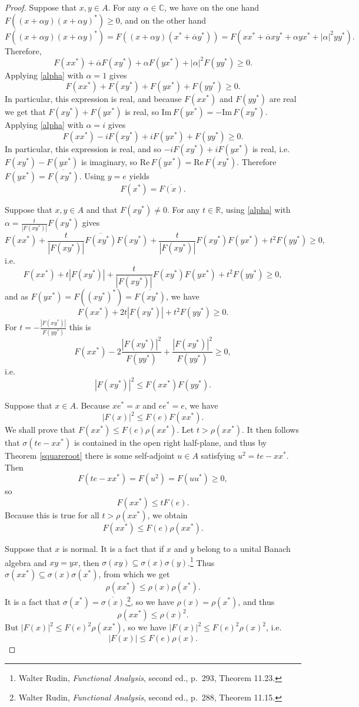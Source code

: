 \documentclass{article}
\def\Re{\ensuremath{\mathrm{Re}}\,}
\def\Im{\ensuremath{\mathrm{Im}}\,}
\theoremstyle{definition}
\theoremstyle{definition}
\begin{document}
\begin{proof}
Suppose that $x,y \in A$.
For any $\alpha \in \mathbb{C}$, we have on the one hand $F((x+\alpha y)(x+\alpha y)^*) \geq 0$, and on the other hand
\[
F((x+\alpha y)(x+\alpha y)^*) = F((x+\alpha y)(x^*+\overline{\alpha}y^*))  = 
F(xx^*+\overline{\alpha}xy^*+\alpha yx^*+|\alpha|^2 yy^*).
\]
Therefore,
\begin{equation}
F(xx^*) + \overline{\alpha}F(xy^*)+\alpha F(yx^*)+|\alpha|^2 F(yy^*) \geq 0.
\label{alpha}
\end{equation}
Applying \eqref{alpha} with $\alpha=1$ gives
\[
F(xx^*) + F(xy^*)+F(yx^*)+F(yy^*) \geq 0.
\]
In particular, this expression is real, and because $F(xx^*)$ and $F(yy^*)$ are real we get that
$F(xy^*)+F(yx^*)$ is real, so $\Im F(yx^*)=-\Im F(xy^*)$.
Applying \eqref{alpha} with $\alpha=i$ gives
\[
F(xx^*) -iF(xy^*)+iF(yx^*)+F(yy^*) \geq 0.
\]
In particular, this expression is real, and so $-iF(xy^*)+iF(yx^*)$ is real, i.e. $F(xy^*)-F(yx^*)$ is imaginary, so $\Re F(yx^*)=\Re F(xy^*)$. Therefore
$F(yx^*)=\overline{F(xy^*)}$. Using $y=e$ yields
\[
F(x^*)=\overline{F(x)}.
\]

Suppose that $x,y \in A$ and that $F(xy^*) \neq 0$. For any $t \in \mathbb{R}$, using \eqref{alpha} with $\alpha = \frac{t}{|F(xy^*)|} F(xy^*)$ gives
\[
F(xx^*) +  \frac{t}{|F(xy^*)|}  \overline{F(xy^*)} F(xy^*) +  \frac{t}{|F(xy^*)|} F(xy^*) F(yx^*)+ t^2 F(yy^*) \geq 0,
\]
i.e.
\[
F(xx^*) + t |F(xy^*)| +   \frac{t}{|F(xy^*)|} F(xy^*) F(yx^*) + t^2 F(yy^*) \geq 0,
\]
and as $F(yx^*)=F((xy^*)^*) = \overline{F(xy^*)}$, we have
\[
F(xx^*)+2t|F(xy^*)| + t^2F(yy^*) \geq 0.
\]
For $t=-\frac{|F(xy^*)|}{F(yy^*)}$ this is
\[
F(xx^*)-2\frac{|F(xy^*)|^2}{F(yy^*)} + \frac{|F(xy^*)|^2}{F(yy^*)} \geq 0,
\]
i.e.
\[
|F(xy^*)|^2 \leq F(xx^*)F(yy^*).
\]

Suppose that $x \in A$. Because $xe^*=x$ and $ee^*=e$, we have 
\[
|F(x)|^2 \leq F(e)F(xx^*).
\]
We shall prove that $F(xx^*) \leq F(e) \rho(xx^*)$.
Let $t>\rho(xx^*)$. It then follows  that $\sigma(te-xx^*)$ is contained in the open right 
half-plane, and thus by Theorem \ref{squareroot} there is some self-adjoint $u \in A$ satisfying $u^2=te-xx^*$. Then
\[
F(te-xx^*) = F(u^2) = F(uu^*) \geq 0,
\]
so
\[
F(xx^*) \leq t F(e).
\]
Because this is true for all $t>\rho(xx^*)$, we obtain
\[
F(xx^*) \leq F(e) \rho(xx^*).
\]

Suppose that $x$ is normal. It is a fact that if $x$ and $y$ belong to a unital Banach algebra and $xy=yx$, then $\sigma(xy)
\subseteq \sigma(x)\sigma(y)$.\footnote{Walter Rudin, {\em Functional Analysis}, second ed., p.~293, Theorem 11.23.}
Thus $\sigma(xx^*) \subseteq \sigma(x)\sigma(x^*)$, from which we get 
\[
\rho(xx^*) \leq \rho(x) \rho(x^*).
\]
It is a fact that $\sigma(x^*)=\overline{\sigma(x)}$,\footnote{Walter Rudin, {\em Functional Analysis}, second ed.,
p.~288, Theorem 11.15.}, so we have $\rho(x)=\rho(x^*)$, and thus
\[
\rho(xx^*) \leq \rho(x)^2.
\]
But $|F(x)|^2 \leq F(e)^2 \rho(xx^*)$, so we have $|F(x)|^2 \leq F(e)^2 \rho(x)^2$, i.e.
\[
|F(x)| \leq F(e) \rho(x).
\] 


\end{proof}
\end{document}
